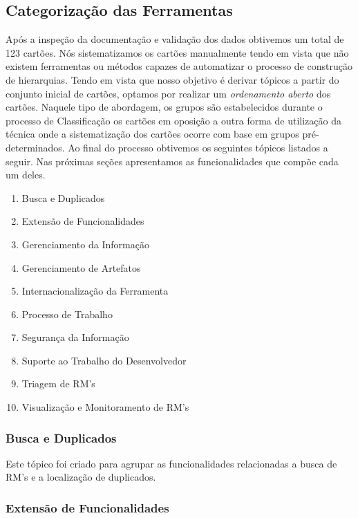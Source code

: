 \subsection{Categorização das Ferramentas}
\label{subsec:categorizacao_ferramentas}

Após a inspeção da documentação e validação dos dados obtivemos um total de 123
cartões. Nós sistematizamos os cartões manualmente tendo em vista que não
existem ferramentas ou métodos capazes de automatizar o processo de construção
de hierarquias. Tendo em vista que nosso objetivo é derivar tópicos a partir do
conjunto inicial de cartões, optamos por realizar um \textit{ordenamento aberto}
dos cartões.  Naquele tipo de abordagem, os grupos são estabelecidos durante o
processo de Classificação os cartões em oposição a outra forma de utilização da
técnica onde a sistematização dos cartões ocorre com base em grupos
pré-determinados.  Ao final do processo obtivemos os seguintes tópicos listados
a seguir. Nas próximas seções apresentamos as funcionalidades que compõe cada um
deles.

\begin{enumerate}
	\item{Busca e Duplicados}
	\item{Extensão de Funcionalidades}
	\item{Gerenciamento da Informação}
	\item{Gerenciamento de Artefatos}
	\item{Internacionalização da Ferramenta}
	\item{Processo de Trabalho}
	\item{Segurança da Informação}
	\item{Suporte ao Trabalho do Desenvolvedor}
	\item{Triagem de RM's}
	\item{Visualização e Monitoramento de RM's}
\end{enumerate}

\subsubsection{Busca e Duplicados}

Este tópico foi criado para agrupar as funcionalidades relacionadas a busca de
RM's e a localização de duplicados.
\subsubsection{Extensão de Funcionalidades}

